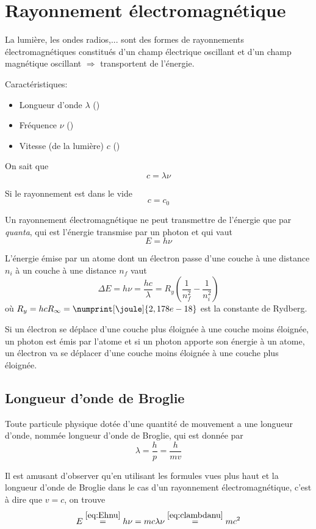 \section{Rayonnement électromagnétique}

La lumière, les ondes radios,...
sont des formes de rayonnements électromagnétiques constitués d'un champ électrique oscillant et d'un champ magnétique oscillant $\Rightarrow$ transportent de l'énergie.

Caractéristiques:
\begin{itemize}
  \item Longueur d'onde $\lambda$ (\meter)
  \item Fréquence $\nu$ (\hertz)
  \item Vitesse (de la lumière) $c$ (\meter\per\second)
\end{itemize}

On sait que
\begin{equation}
  \label{eq:clambdanu}
  c = \lambda \nu
\end{equation}

Si le rayonnement est dans le vide
\[ c = c_0 \]

Un rayonnement électromagnétique ne peut transmettre de l'énergie que par {\it quanta},
qui est l'énergie transmise par un photon et qui vaut
\begin{equation}
  \label{eq:Ehnu}
  E = h\nu
\end{equation}

L'énergie émise par un atome dont un électron passe d'une couche à une distance $n_i$ à un couche à une distance $n_f$ vaut
\[ \Delta E = h\nu = \frac{hc}{\lambda} = R_y \left( \frac{1}{n_f^2} - \frac{1}{n_i^2} \right) \]
où $R_y = hc R_\infty = \numprint[\joule]{2,178e-18}$ est la constante de Rydberg.

Si un électron se déplace d'une couche plus éloignée à une couche moins éloignée,
un photon est émis par l'atome et si un photon apporte son énergie à un atome,
un électron va se déplacer d'une couche moins éloignée à une couche plus éloignée.

\subsection{Longueur d'onde de Broglie}
Toute particule physique dotée d'une quantité de mouvement a une longueur
d'onde, nommée longueur d'onde de Broglie, qui est donnée par
\[ \lambda = \frac{h}{p} = \frac{h}{mv} \]

Il est amusant d'observer qu'en utilisant les formules vues plus haut
et la longueur d'onde de Broglie dans le cas d'un rayonnement électromagnétique,
c'est à dire que $v = c$, on trouve
\[ E \stackrel{\eqref{eq:Ehnu}}{=} h\nu = mc\lambda\nu \stackrel{\eqref{eq:clambdanu}}{=} mc^2 \]


